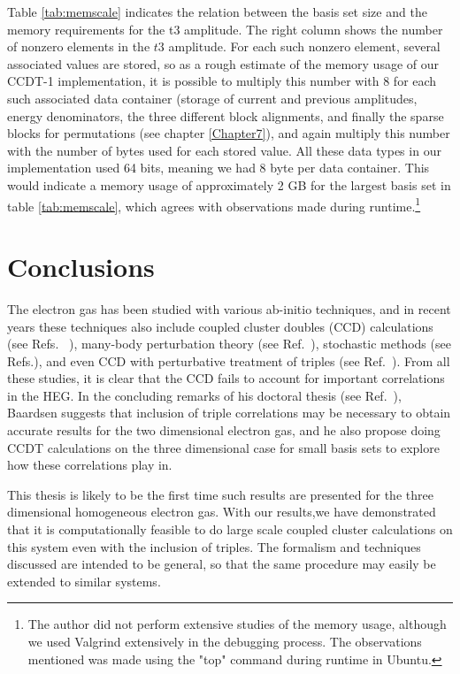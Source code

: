 Table \ref{tab:memscale} indicates the relation between the basis set size and the memory requirements for the t3 amplitude. The right column shows the number of nonzero elements in the $t3$ amplitude. For each such nonzero element, several associated values are stored, so as a rough estimate of the memory usage of our CCDT-1 implementation, it is possible to multiply this number with 8 for each such associated data container (storage of current and previous amplitudes, energy denominators, the three different block alignments, and finally the sparse blocks for permutations (see chapter \ref{Chapter7}), and again multiply this number with the number of bytes used for each stored value. All these data types in our implementation used 64 bits, meaning we had 8 byte per data container. This would indicate a memory usage of approximately 2 GB for the largest basis set in table \ref{tab:memscale}, which agrees with observations made during runtime.\footnote{The author did not perform extensive studies of the memory usage, although we used Valgrind extensively in the debugging process. The observations mentioned was made using the "top" command during runtime in Ubuntu.}


\FloatBarrier

\section{Conclusions}

The electron gas has been studied with various ab-initio techniques, and in recent years these techniques also include coupled cluster doubles (CCD) calculations (see Refs.~ \cite{Baardsen2014, Shepherd2012}), many-body perturbation theory (see Ref.~\cite{Shepherd2013}), stochastic methods (see Refs.\cite{Shepherd2012, Roggero2013, Leikanger2013}), and even CCD with perturbative treatment of triples (see Ref.~\cite{Shepherd2013}). From all these studies, it is clear that the CCD fails to account for important correlations in the HEG. In the concluding remarks of his doctoral thesis (see Ref.~\cite{Baardsen2014}), Baardsen suggests that inclusion of triple correlations may be necessary to obtain accurate results for the two dimensional electron gas, and he also propose doing CCDT calculations on the three dimensional case for small basis sets to explore how these correlations play in.

This thesis is likely to be the first time such results are presented for the three dimensional homogeneous electron gas. With our results,we have demonstrated that it is computationally feasible to do large scale coupled cluster calculations on this system even with the inclusion of triples. The formalism and techniques discussed are intended to be general, so that the same procedure may easily be extended to similar systems.

